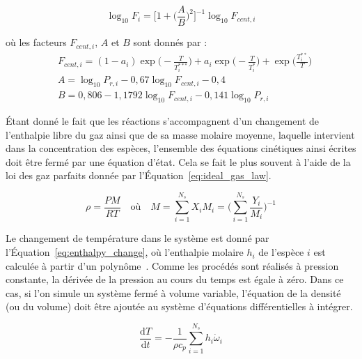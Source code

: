 \begin{equation}
  \log_{10}F_{i}=
  \biggr[1+\biggr(\frac{A}{B}\biggr)^{2}\biggr]^{-1}\log_{10}F_{cent,i}
  \label{eq:falloff}
\end{equation}

\noindent où les facteurs $F_{cent,i}$, $A$ et $B$ sont donnés par : 
\[
\begin{aligned} 
  & F_{cent,i}=
   (1-a_{i})\exp\biggr(-\frac{T}{T_{i}^{***}}\biggr)+
   a_{i}\exp\biggr(-\frac{T}{T_{i}^{*}}\biggr)+
   \exp\biggr(\frac{T_{i}^{**}}{T}\biggr)\\[5pt]
  & A=\log_{10}P_{r,i}-0,67\log_{10}F_{cent,i}-0,4\\[5pt]
  & B=0,806-1,1792\log_{10}F_{cent,i}-0,141\log_{10}P_{r,i}
\end{aligned}
\]

\clearpage

Étant donné le fait que les réactions s'accompagnent d'un changement de l'enthalpie libre du gaz ainsi que de sa masse molaire moyenne, laquelle intervient dans la concentration des espèces, l'ensemble des équations cinétiques ainsi écrites doit être fermé par une équation d'état. Cela se fait le plus souvent à l'aide de la loi des gaz parfaits donnée par l'Équation~\ref{eq:ideal_gas_law}.

\begin{equation}
  \rho=\frac{PM}{RT}\quad\text{où}\quad
  M=\sum_{i=1}^{N_{s}}X_{i}M_{i}=
  \biggr(\sum_{i=1}^{N_{s}}\frac{Y_{i}}{M_{i}}\biggr)^{-1}
  \label{eq:ideal_gas_law}
\end{equation}

Le changement de température dans le système est donné par l'Équation~\ref{eq:enthalpy_change}, où l'enthalpie molaire $h_{i}$ de l'espèce $i$ est calculée à partir d'un polynôme~\cite{Tchem2011}. Comme les procédés sont réalisés à pression constante, la dérivée de la pression au cours du temps est égale à zéro. Dans ce cas, si l'on simule un système fermé à volume variable, l'équation de la densité (ou du volume) doit être ajoutée au système d'équations différentielles à intégrer.

\begin{equation}
  \frac{\mathrm{d}T}{\mathrm{d}t}=
  -\frac{1}{\rho c_{p}}\sum_{i=1}^{N_{s}}h_{i}\dot{\omega}_{i}
  \label{eq:enthalpy_change}
\end{equation}

